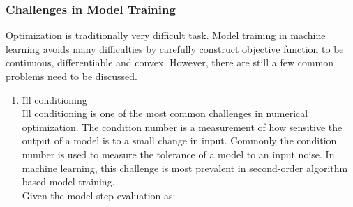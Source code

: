 \subsubsection{Challenges in Model Training}

Optimization is traditionally very difficult task. Model training in machine learning avoids many difficulties by carefully construct objective function to be continuous, differentiable and convex. However, there are still a few common problems need to be discussed. 

\begin{enumerate}
    \item Ill conditioning\\
Ill conditioning is one of the most common challenges in numerical optimization. The condition number is a measurement of how sensitive the output of a model is to a small change in input. Commonly the condition number is used to measure the tolerance of a model to an input noise. In machine learning, this challenge is most prevalent in second-order algorithm based model training.\\

Given the model step evaluation as:


\end{enumerate}
